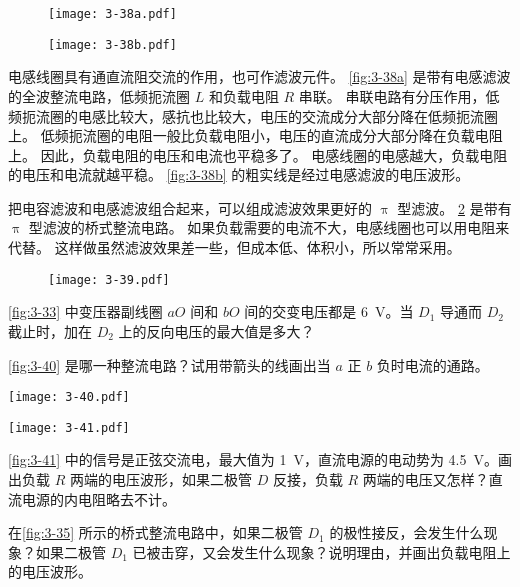 \begin{figure}
  \begin{minipage}[b]{0.48\linewidth}\centering
    \texttt{[image: 3-38a.pdf]}
    \subcaption{}\label{fig:3-38a}
  \end{minipage}
  \begin{minipage}[b]{0.48\linewidth}\centering
    \texttt{[image: 3-38b.pdf]}
    \subcaption{}\label{fig:3-38b}
  \end{minipage}
  \caption{}\label{fig:3-38}
\end{figure}

电感线圈具有通直流阻交流的作用，也可作滤波元件。
\cref{fig:3-38a} 是带有电感滤波的全波整流电路，低频扼流圈 $L$ 和负载电阻 $R$ 串联。
串联电路有分压作用，低频扼流圈的电感比较大，感抗也比较大，电压的交流成分大部分降在低频扼流圈上。
低频扼流圈的电阻一般比负载电阻小，电压的直流成分大部分降在负载电阻上。
因此，负载电阻的电压和电流也平稳多了。
电感线圈的电感越大，负载电阻的电压和电流就越平稳。
\cref{fig:3-38b} 的粗实线是经过电感滤波的电压波形。

把电容滤波和电感滤波组合起来，可以组成滤波效果更好的 $\uppi$ 型滤波。
\cref{fig:3-39} 是带有 $\uppi$ 型滤波的桥式整流电路。
如果负载需要的电流不大，电感线圈也可以用电阻来代替。
这样做虽然滤波效果差一些，但成本低、体积小，所以常常采用。
\begin{figure}
  \texttt{[image: 3-39.pdf]}
  \caption{}\label{fig:3-39}
\end{figure}

\begin{Practice}
\begin{question}
	\item \cref{fig:3-33} 中变压器副线圈 $aO$ 间和 $bO$ 间的交变电压都是 \qty{6}{V}。当 $D_1$ 导通而 $D_2$ 截止时，加在 $D_2$ 上的反向电压的最大值是多大？
	\item \cref{fig:3-40} 是哪一种整流电路？试用带箭头的线画出当 $a$ 正 $b$ 负时电流的通路。
  \begin{figurehere}
    \begin{minipage}{0.63\linewidth}\centering
      \texttt{[image: 3-40.pdf]}
      \caption{}\label{fig:3-40}
    \end{minipage}\hfill
    \begin{minipage}{0.32\linewidth}\centering
      \texttt{[image: 3-41.pdf]}
      \caption{}\label{fig:3-41}
    \end{minipage}
  \end{figurehere}
	\item \cref{fig:3-41} 中的信号是正弦交流电，最大值为 \qty{1}{V}，直流电源的电动势为 \qty{4.5}{V}。画出负载 $R$ 两端的电压波形，如果二极管 $D$ 反接，负载 $R$ 两端的电压又怎样？直流电源的内电阻略去不计。
	\item 在\cref{fig:3-35} 所示的桥式整流电路中，如果二极管 $D_1$ 的极性接反，会发生什么现象？如果二极管 $D_1$ 已被击穿，又会发生什么现象？说明理由，并画出负载电阻上的电压波形。

\end{question}
\end{Practice}
	
